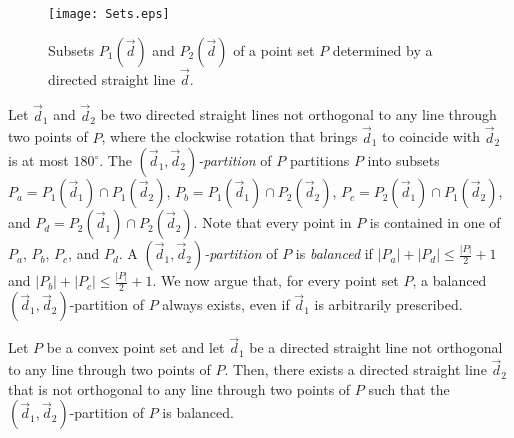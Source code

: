 \documentclass{llncs}
\begin{document}
\begin{figure}[tb]
\begin{center}
\mbox{\texttt{[image: Sets.eps]}}
\caption{Subsets $P_1({\vec d})$ and $P_2({\vec d})$ of a point set $P$ determined by a directed straight line $\vec d$.}
\label{fig:sets}
\end{center}
\end{figure}

Let ${\vec d}_1$ and ${\vec d}_2$ be two directed straight lines not orthogonal to any line through two points of $P$, where the clockwise rotation that brings ${\vec d}_1$ to coincide with ${\vec d}_2$ is at most $180^\circ$. The {\em $({\vec d}_1,{\vec d}_2)$-partition} of $P$ partitions $P$ into subsets $P_a=P_{1}({\vec d}_1)\cap P_{1}({\vec d}_2)$, $P_b=P_{1}({\vec d}_1)\cap P_{2}({\vec d}_2)$, $P_c=P_{2}({\vec d}_1)\cap P_{1}({\vec d}_2)$, and
$P_d=P_{2}({\vec d}_1)\cap P_{2}({\vec d}_2)$. Note that every point in $P$ is contained in one of $P_a$, $P_b$, $P_c$, and $P_d$. A {\em $({\vec d}_1,{\vec d}_2)$-partition} of $P$ is {\em balanced} if $|P_a|+|P_d|\leq \frac{|P|}{2} +1$ and $|P_b|+|P_c|\leq \frac{|P|}{2} +1$. We now argue that, for every point set $P$, a balanced $({\vec d}_1,{\vec d}_2)$-partition of $P$ always exists, even if ${\vec d}_1$ is arbitrarily prescribed.

\begin{lemma} \label{le:partition}
Let $P$ be a convex point set and let ${\vec d}_1$ be a directed straight line not orthogonal to any line through two points of $P$. Then, there exists a directed straight line ${\vec d}_2$ that is not orthogonal to any line through two points of $P$ such that the $({\vec d}_1,{\vec d}_2)$-partition of $P$ is balanced.
\end{lemma}
\end{document}
